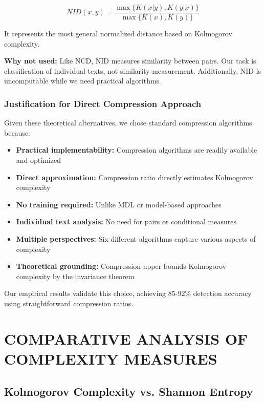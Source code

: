 \documentclass[12pt,a4paper]{report}
\begin{document}
\begin{equation}
NID(x,y) = \frac{\max\{K(x|y), K(y|x)\}}{\max\{K(x), K(y)\}}
\end{equation}

It represents the most general normalized distance based on Kolmogorov complexity.

\textbf{Why not used:} Like NCD, NID measures similarity between pairs. Our task is classification of individual texts, not similarity measurement. Additionally, NID is uncomputable while we need practical algorithms.

\subsection{Justification for Direct Compression Approach}

Given these theoretical alternatives, we chose standard compression algorithms because:

\begin{itemize}
    \item \textbf{Practical implementability:} Compression algorithms are readily available and optimized
    \item \textbf{Direct approximation:} Compression ratio directly estimates Kolmogorov complexity
    \item \textbf{No training required:} Unlike MDL or model-based approaches
    \item \textbf{Individual text analysis:} No need for pairs or conditional measures
    \item \textbf{Multiple perspectives:} Six different algorithms capture various aspects of complexity
    \item \textbf{Theoretical grounding:} Compression upper bounds Kolmogorov complexity by the invariance theorem
\end{itemize}

Our empirical results validate this choice, achieving 85-92\% detection accuracy using straightforward compression ratios.

\chapter{COMPARATIVE ANALYSIS OF COMPLEXITY MEASURES}

\section{Kolmogorov Complexity vs. Shannon Entropy}
\end{document}
